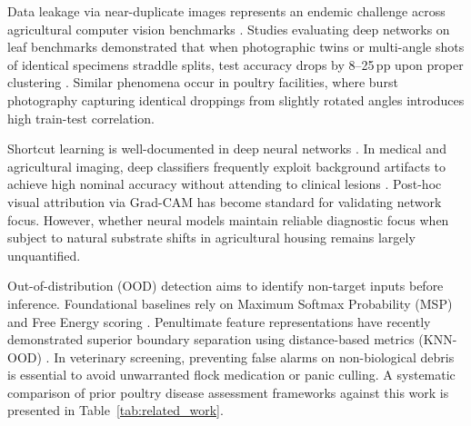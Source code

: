 \documentclass[conference]{IEEEtran}
\begin{document}
Data leakage via near-duplicate images represents an endemic challenge across agricultural computer vision benchmarks \cite{barbedo2018factors}. Studies evaluating deep networks on leaf benchmarks demonstrated that when photographic twins or multi-angle shots of identical specimens straddle splits, test accuracy drops by 8--25\,pp upon proper clustering \cite{petchiammal2023paddy, barbedo2018factors}. Similar phenomena occur in poultry facilities, where burst photography capturing identical droppings from slightly rotated angles introduces high train-test correlation.

Shortcut learning is well-documented in deep neural networks \cite{geirhos2020shortcut, lapuschkin2019unmasking}. In medical and agricultural imaging, deep classifiers frequently exploit background artifacts to achieve high nominal accuracy without attending to clinical lesions \cite{lapuschkin2019unmasking}. Post-hoc visual attribution via Grad-CAM \cite{selvaraju2017grad} has become standard for validating network focus. However, whether neural models maintain reliable diagnostic focus when subject to natural substrate shifts in agricultural housing remains largely unquantified.

Out-of-distribution (OOD) detection aims to identify non-target inputs before inference. Foundational baselines rely on Maximum Softmax Probability (MSP) \cite{hendrycks2017baseline} and Free Energy scoring \cite{liu2020energy}. Penultimate feature representations have recently demonstrated superior boundary separation using distance-based metrics (KNN-OOD) \cite{sun2022knn}. In veterinary screening, preventing false alarms on non-biological debris is essential to avoid unwarranted flock medication or panic culling. A systematic comparison of prior poultry disease assessment frameworks against this work is presented in Table~\ref{tab:related_work}.
\end{document}
